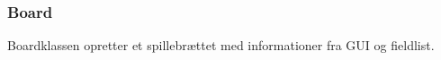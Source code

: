 \subsubsection{Board}
Boardklassen opretter et spillebrættet med informationer fra GUI og fieldlist.